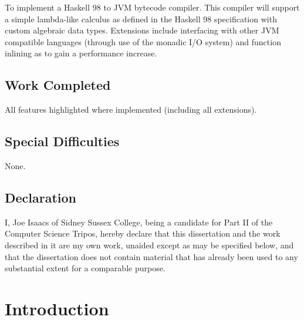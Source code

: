 \documentclass[12pt,a4paper,twoside,openright]{book}
\numberwithin{subcase}{case}
\begin{document}
To implement a Haskell 98 to JVM bytecode compiler. This compiler
will support a simple lambda-like calculus as defined in the Haskell 98 specification with
custom algebraic data types. Extensions include interfacing with other 
JVM compatible languages (through use of the monadic I/O system) and function inlining as to gain
a performance increase.

\section*{Work Completed}

All features highlighted where implemented (including all extensions).

\section*{Special Difficulties}

None.

\newpage


\section*{Declaration}

I, Joe Isaacs of Sidney Sussex College,
being a candidate for Part II of the Computer Science Tripos, hereby declare
that this dissertation and the work described in it are my own work,
unaided except as may be specified below, and that the dissertation
does not contain material that has already been used to any substantial
extent for a comparable purpose.

\bigskip
{}

\medskip
{}



\tableofcontents

\listoffigures
\begingroup
\let\clearpage\relax
\listoftables
\endgroup

\newpage

\mainmatter

\pagestyle{headings}

\chapter{Introduction}
\end{document}
